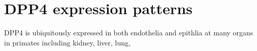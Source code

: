 \section{DPP4 expression patterns}
DPP4 is ubiquitously expressed in both endothelia and epithlia at many organs in primates including kidney, liver, lung, 